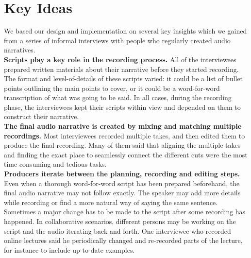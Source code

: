 \section{Key Ideas}
We based our design and implementation on several key insights which we gained from a series of informal interviews with people who regularly created audio narratives. \\
\textbf{Scripts play a key role in the recording process.} All of the interviewees prepared written materials about their narrative before they started recording. The format and level-of-details of these scripts varied: it could be a list of bullet points outlining the main points to cover, or it could be a word-for-word transcription of what was going to be said. In all cases, during the recording phase, the interviewees kept their scripts within view and depended on them to construct their narrative.\\
\textbf{The final audio narrative is created by mixing and matching multiple recordings.} Most interviewees recorded multiple takes, and then edited them to produce the final recording. Many of them said that aligning the multiple takes and finding the exact place to seamlessly connect the different cuts were the most time consuming and tedious tasks.\\
\textbf{Producers iterate between the planning, recording and editing steps.} Even when a thorough word-for-word script has been prepared beforehand, the final audio narrative may not follow exactly. The speaker may add more details while recording or find a more natural way of saying the same sentence. Sometimes a major change has to be made to the script after some recording has happened. In collaborative scenarios, different persons may be working on the script and the audio iterating back and forth. One interviewee who recorded online lectures said he periodically changed and re-recorded parts of the lecture, for instance to include up-to-date examples.
\\

